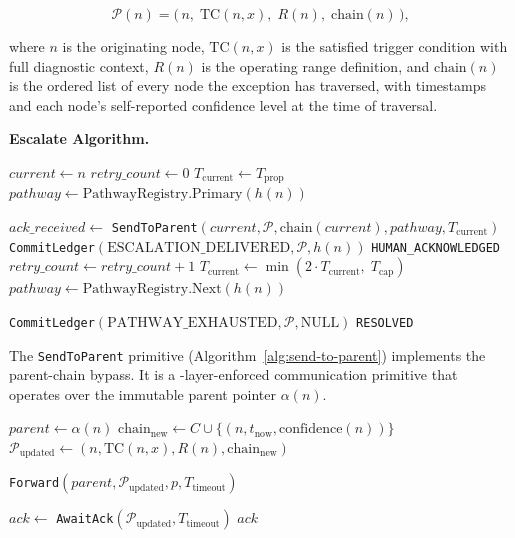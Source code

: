 \[
\mathcal{P}(n) = \bigl(\,n,\; \text{TC}(n, x),\; R(n),\; \text{chain}(n)\,\bigr),
\]

where $n$ is the originating node, $\text{TC}(n, x)$ is the satisfied trigger condition with full diagnostic context, $R(n)$ is the operating range definition, and $\text{chain}(n)$ is the ordered list of every node the exception has traversed, with timestamps and each node's self-reported confidence level at the time of traversal.

\medskip
\noindent\textbf{Escalate Algorithm.}

\begin{algorithm}[H]
\caption{Escalate$(n, \mathcal{P})$ --- Executed by the Bailout Monitor}\label{alg:escalate}
\begin{algorithmic}[1]
\State $current \leftarrow n$
\State $retry\_count \leftarrow 0$
\State $T_{\text{current}} \leftarrow T_{\text{prop}}$
\State $pathway \leftarrow \text{PathwayRegistry.Primary}(h(n))$

    \State $ack\_received \leftarrow$ \texttt{SendToParent}$(current, \mathcal{P}, \text{chain}(current), pathway, T_{\text{current}})$
        \State \texttt{CommitLedger}$(\text{ESCALATION\_DELIVERED}, \mathcal{P}, h(n))$
        \State \Return \texttt{HUMAN\_ACKNOWLEDGED}
    \EndIf
    \State $retry\_count \leftarrow retry\_count + 1$
    \State $T_{\text{current}} \leftarrow \min(2 \cdot T_{\text{current}},\; T_{\text{cap}})$
    \State $pathway \leftarrow \text{PathwayRegistry.Next}(h(n))$
\EndWhile

\State \texttt{CommitLedger}$(\text{PATHWAY\_EXHAUSTED}, \mathcal{P}, \text{NULL})$
\State \Return \texttt{RESOLVED} 
\end{algorithmic}
\end{algorithm}

The \texttt{SendToParent} primitive (Algorithm~\ref{alg:send-to-parent}) implements the parent-chain bypass. It is a \fact-layer-enforced communication primitive that operates over the immutable parent pointer $\alpha(n)$.

\begin{algorithm}[H]
\caption{\texttt{SendToParent}$(n, \mathcal{P}, C, p, T_{\text{timeout}})$ --- Bypass Primitive}\label{alg:send-to-parent}
\begin{algorithmic}[1]
\State $parent \leftarrow \alpha(n)$
\State $\text{chain}_{\text{new}} \leftarrow C \cup \{(n, t_{\text{now}}, \text{confidence}(n))\}$
\State $\mathcal{P}_{\text{updated}} \leftarrow (n, \text{TC}(n, x), R(n), \text{chain}_{\text{new}})$

\State \texttt{Forward}$(parent, \mathcal{P}_{\text{updated}}, p, T_{\text{timeout}})$

\State $ack \leftarrow$ \texttt{AwaitAck}$(\mathcal{P}_{\text{updated}}, T_{\text{timeout}})$
\State \Return $ack$
\end{algorithmic}
\end{algorithm}

